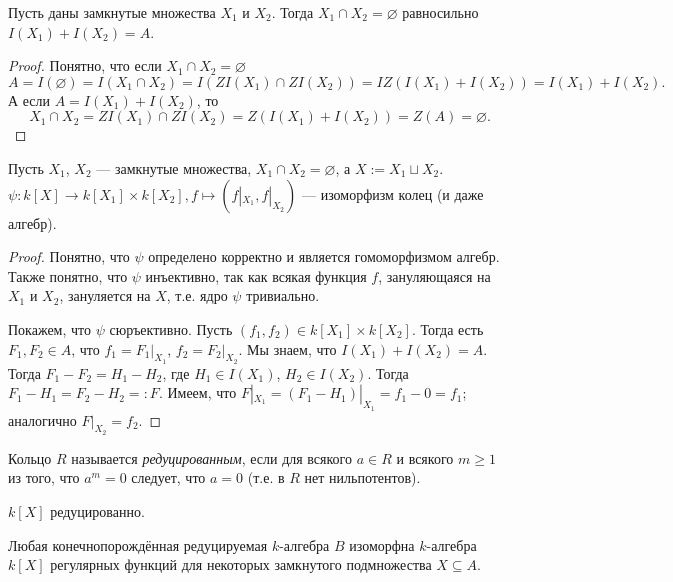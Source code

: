 \documentclass[12pt,a4paper]{article}
\begin{document}
    \begin{lemma}
        Пусть даны замкнутые множества $X_1$ и $X_2$. Тогда $X_1 \cap X_2 = \varnothing$ равносильно $I(X_1) + I(X_2) = A$.
    \end{lemma}

    \begin{proof}
        Понятно, что если $X_1 \cap X_2 = \varnothing$
        \[A = I(\varnothing) = I(X_1 \cap X_2) = I(ZI(X_1) \cap ZI(X_2)) = IZ(I(X_1) + I(X_2)) = I(X_1) + I(X_2).\]
        А если $A = I(X_1) + I(X_2)$, то
        \[X_1 \cap X_2 = ZI(X_1) \cap ZI(X_2) = Z(I(X_1) + I(X_2)) = Z(A) = \varnothing.\]
    \end{proof}

    \begin{theorem}
        Пусть $X_1$, $X_2$ --- замкнутые множества, $X_1 \cap X_2 = \varnothing$, а $X := X_1 \sqcup X_2$. $\psi: k[X] \to k[X_1] \times k[X_2], f \mapsto (f|_{X_1}, f|_{X_2})$ --- изоморфизм колец (и даже алгебр).
    \end{theorem}

    \begin{proof}
        Понятно, что $\psi$ определено корректно и является гомоморфизмом алгебр. Также понятно, что $\psi$ инъективно, так как всякая функция $f$, зануляющаяся на $X_1$ и $X_2$, зануляется на $X$, т.е. ядро $\psi$ тривиально.

        Покажем, что $\psi$ сюръективно. Пусть $(f_1, f_2) \in k[X_1] \times k[X_2]$. Тогда есть $F_1, F_2 \in A$, что $f_1 = F_1|_{X_1}$, $f_2 = F_2|_{X_2}$. Мы знаем, что $I(X_1) + I(X_2) = A$. Тогда $F_1 - F_2 = H_1 - H_2$, где $H_1 \in I(X_1)$, $H_2 \in I(X_2)$. Тогда $F_1 - H_1 = F_2 - H_2 =: F$. Имеем, что $F|_{X_1} = (F_1 - H_1)|_{X_1} = f_1 - 0 = f_1$; аналогично $F|_{X_2} = f_2$.
    \end{proof}

    \begin{definition}
        Кольцо $R$ называется \emph{редуцированным}, если для всякого $a \in R$ и всякого $m \geqslant 1$ из того, что $a^m = 0$ следует, что $a = 0$ (т.е. в $R$ нет нильпотентов).
    \end{definition}

    \begin{remark*}
        $k[X]$ редуцированно.
    \end{remark*}

    \begin{lemma}
        Любая конечнопорождённая редуцируемая $k$-алгебра $B$ изоморфна $k$-алгебра $k[X]$ регулярных функций для некоторых замкнутого подмножества $X \subseteq A$.
    \end{lemma}
\end{document}
